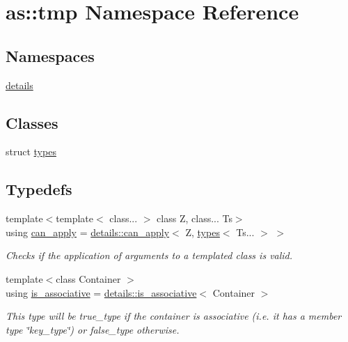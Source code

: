 \hypertarget{namespaceas_1_1tmp}{}\section{as\+:\+:tmp Namespace Reference}
\label{namespaceas_1_1tmp}
\subsection*{Namespaces}
\begin{DoxyCompactItemize}
\item 
 \hyperlink{namespaceas_1_1tmp_1_1details}{details}
\end{DoxyCompactItemize}
\subsection*{Classes}
\begin{DoxyCompactItemize}
\item 
struct \hyperlink{structas_1_1tmp_1_1types}{types}
\end{DoxyCompactItemize}
\subsection*{Typedefs}
\begin{DoxyCompactItemize}
\item 
{\footnotesize template$<$template$<$ class... $>$ class Z, class... Ts$>$ }\\using \hyperlink{namespaceas_1_1tmp_a44a275bd3c66d727fb1b6f0179d49e19}{can\+\_\+apply} = \hyperlink{structas_1_1tmp_1_1details_1_1can__apply}{details\+::can\+\_\+apply}$<$ Z, \hyperlink{structas_1_1tmp_1_1types}{types}$<$ Ts... $>$ $>$
\begin{DoxyCompactList}\small\item\em Checks if the application of arguments to a templated class is valid. \end{DoxyCompactList}\item 
{\footnotesize template$<$class Container $>$ }\\using \hyperlink{namespaceas_1_1tmp_a893659f8b2cd22837c8f494a6f4a61d9}{is\+\_\+associative} = \hyperlink{structas_1_1tmp_1_1details_1_1is__associative}{details\+::is\+\_\+associative}$<$ Container $>$
\begin{DoxyCompactList}\small\item\em This type will be true\+\_\+type if the container is associative (i.\+e. it has a member type \char`\"{}key\+\_\+type\char`\"{}) or false\+\_\+type otherwise. \end{DoxyCompactList}\end{DoxyCompactItemize}


